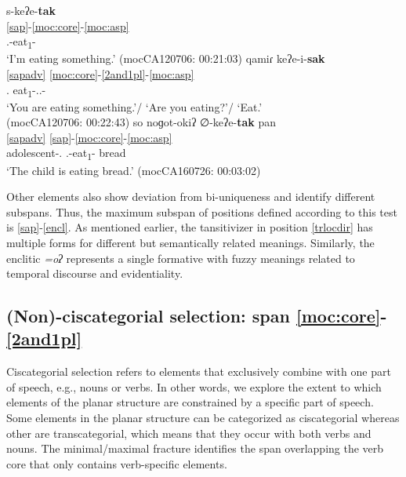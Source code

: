 \documentclass[output=paper]{langscibook}
\begin{document}
\ea\label{ex:aspectsalter}
\ea \label{ex:asp1st}
\glll s-keʔe-\textbf{tak}\\
     \ref{sap}-\ref{moc:core}-\ref{moc:asp}\\
      {\First.\II}-eat\textsubscript{1}-{\Prog}\\
\glt `I'm eating something.' \hfill (mocCA120706: 00:21:03)
\ex \label{ex:asp2nd}
\glll qamiɾ keʔe-i-\textbf{sak}\\
     \ref{sapadv} \ref{moc:core}-\ref{2and1pl}-\ref{moc:asp}\\
     {\Second\Sg.\Pron} eat\textsubscript{1}-{\Second.\Sg.\II}-{\Prog}\\
\glt `You are eating something.'/ `Are you eating?'/ `Eat.' \\
\glt \hfill (mocCA120706: 00:22:43)
\ex \label{ex:asp3rd}
\glll so noɡot-okiʔ ∅-keʔe-\textbf{tak} pan \\
     \ref{sapadv} {} \ref{sap}-\ref{moc:core}-\ref{moc:asp}\\
     {\DetTwo} adolescent-{\Dim.\M} {\Third.\II}-eat\textsubscript{1}-{\Prog} bread\\
\glt `The child is eating bread.' \hfill (mocCA160726: 00:03:02)
\z
\z 

Other elements also show deviation from bi-uniqueness and identify different subspans. Thus, the maximum subspan of positions defined according to this test is \ref{sap}-\ref{encl}. As mentioned earlier, the tansitivizer in position \ref{trlocdir} has multiple forms for different but semantically related meanings. Similarly, the enclitic \textit{=oʔ} represents a single formative with fuzzy meanings related to temporal discourse and evidentiality.  

\subsection{(Non)-ciscategorial selection: span \ref{moc:core}-\ref{2and1pl}}
\label{sec:nonciscategorial}

Ciscategorial selection refers to elements that exclusively combine with one part of speech, e.g., nouns or verbs. In other words, we explore the extent to which elements of the planar structure are constrained by a specific part of speech. Some elements in the planar structure can be categorized as ciscategorial whereas other are transcategorial, which means that they occur with both verbs and nouns. The minimal/maximal fracture identifies the span overlapping the verb core that only contains verb-specific elements. 
\end{document}
